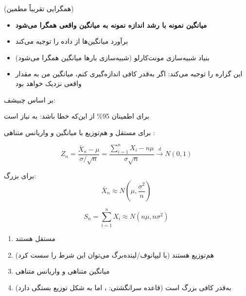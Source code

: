 (همگرایی تقریباً مطمین)


\begin{itemize}
\tightlist
\item
  \textbf{میانگین نمونه با رشد اندازه نمونه به میانگین واقعی همگرا می‌شود}
\item
  برآورد میانگین‌ها از داده را توجیه می‌کند
\item
  بنیاد شبیه‌سازی مونت‌کارلو (شبیه‌سازی بارها \lr{\ensuremath{\to}} میانگین همگرا می‌شود)
\item
  این گزاره را توجیه می‌کند: اگر به‌قدر کافی اندازه‌گیری کنم، میانگین من به مقدار واقعی نزدیک خواهد بود
\end{itemize}


بر اساس چبیشف: 

برای اطمینان 95\% از این‌که خطا \lr{\textless{} \ensuremath{\varepsilon}} باشد: به  نیاز است



برای  مستقل و هم‌توزیع  با میانگین \lr{\ensuremath{\mu}} و واریانس متناهی :

\[Z_n = \frac{\bar{X}_n - \mu}{\sigma/\sqrt{n}} = \frac{\sum_{i=1}^n X_i - n\mu}{\sigma\sqrt{n}} \xrightarrow{d} N(0,1)\]


برای  بزرگ:\PSbr{}\[\bar{X}_n \approx N\left(\mu, \frac{\sigma^2}{n}\right)\]

\[S_n = \sum_{i=1}^n X_i \approx N(n\mu, n\sigma^2)\]


\begin{enumerate}
\def\labelenumi{\arabic{enumi}.}
\tightlist
\item
   مستقل هستند
\item
  هم‌توزیع هستند (با  لیپانوف/لینده‌برگ می‌توان این شرط را سست کرد)
\item
  میانگین متناهی \lr{\ensuremath{\mu}} و واریانس متناهی 
\item
  به‌قدر کافی بزرگ است (قاعده سرانگشتی: ، اما به شکل توزیع بستگی دارد)
\end{enumerate}


